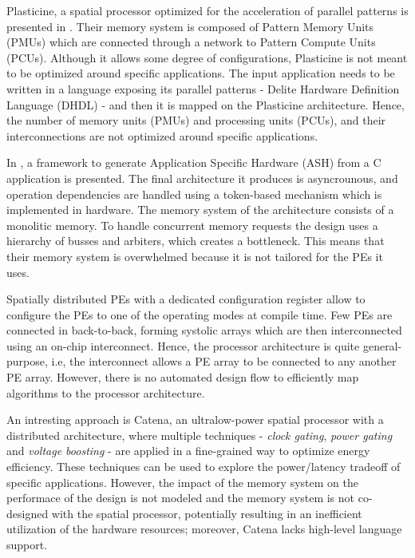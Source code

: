 Plasticine, a spatial processor optimized for the acceleration of parallel patterns is presented in \cite{prabhakar2017plasticine}. Their memory system is composed of Pattern Memory Units (PMUs) which are connected through a network to Pattern Compute Units (PCUs). Although it allows some degree of configurations, Plasticine is not meant to be optimized around specific applications. The input application needs to be written in a language exposing its parallel patterns - Delite Hardware Definition Language (DHDL) - and then it is mapped on the Plasticine architecture. Hence, the number of memory units (PMUs) and processing units (PCUs), and their interconnections are not optimized around specific applications.

In \cite{budiu2004spatial}, a framework to generate Application Specific Hardware (ASH) from a C application is presented. The final architecture it produces is asyncrounous, and operation dependencies are handled using a token-based mechanism which is implemented in hardware. The memory system of the architecture consists of a monolitic memory. To handle concurrent memory requests the design uses a hierarchy of busses and arbiters, which creates a bottleneck. This means that their memory system is overwhelmed because it is not tailored for the PEs it uses.

Spatially distributed PEs with a dedicated configuration register allow to configure the PEs to one of the operating modes \cite{streamproc2019} at compile time. Few PEs are connected in back-to-back, forming systolic arrays which are then interconnected using an on-chip interconnect. Hence, the processor architecture is quite general-purpose, i.e, the interconnect allows a PE array to be connected to any another PE array. However, there is no automated design flow to efficiently map algorithms to the processor architecture.

An intresting approach is Catena\cite{cerqueira2020catena}, an ultralow-power spatial processor with a distributed architecture, where multiple techniques - \textit{clock gating}, \textit{power gating} and \textit{voltage boosting} - are applied in a fine-grained way to optimize energy efficiency. These techniques can be used to explore the power/latency tradeoff of specific applications. However, the impact of the memory system on the performace of the design is not modeled and the memory system is not co-designed with the spatial processor, potentially resulting in an inefficient utilization of the hardware resources; moreover, Catena lacks high-level language support.


